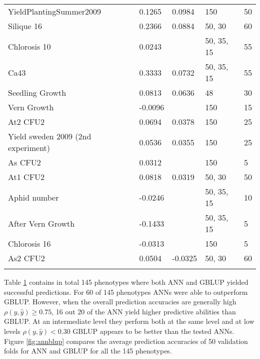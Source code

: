 \begin{longtable}{p{} p{} p{} p{} p{}}
  YieldPlantingSummer2009            & 0.1265  & 0.0984               & 150          & 50     \\
  Silique 16                         & 0.2366  & 0.0884               & 50, 30       & 60     \\
  Chlorosis 10                       & 0.0243  & \color{red}{0.088}   & 50, 35, 15   & 55     \\
  Ca43                               & 0.3333  & 0.0732               & 50, 35, 15   & 55     \\
  Seedling Growth                    & 0.0813  & 0.0636               & 48           & 30     \\
  Vern Growth                        & -0.0096 & \color{red}{0.0422}  & 150          & 15     \\
  At2 CFU2                           & 0.0694  & 0.0378               & 150          & 25     \\
  Yield sweden 2009 (2nd experiment) & 0.0536  & 0.0355               & 150          & 25     \\
  As CFU2                            & 0.0312  & \color{red}{0.035}   & 150          & 5      \\
  At1 CFU2                           & 0.0818  & 0.0319               & 50, 30       & 50     \\
  Aphid number                       & -0.0246 & \color{red}{0.029}   & 50, 35, 15   & 10     \\
  After Vern Growth                  & -0.1433 & \color{red}{0.0057}  & 50, 35, 15   & 5      \\
  Chlorosis 16                       & -0.0313 & \color{red}{-0.0121} & 150          & 5      \\
  As2 CFU2                           & 0.0504  & -0.0325              & 50, 30       & 60     \\
  \bottomrule
\label{tab:at_res}
\end{longtable}
\doublespacing


Table \ref{tab:at_res} contains in total 145 phenotypes where both ANN and GBLUP yielded
successful predictions. For 60 of 145 phenotypes ANNs were able to outperform
GBLUP. However, when the overall prediction accuracies are generally high
$\rho(y,\hat{y}) \geq 0.75$, 16 out 20 of the ANN yield higher predictive abilities than
GBLUP. At an intermediate level they perform both at the same level and at low levels
$\rho(y,\hat{y}) < 0.30$ GBLUP appears to be better than the tested ANNs.\\
Figure \ref{fig:annblup} compares the average prediction accuracies of 50 validation folds
for ANN and GBLUP for all the 145 phenotypes.

